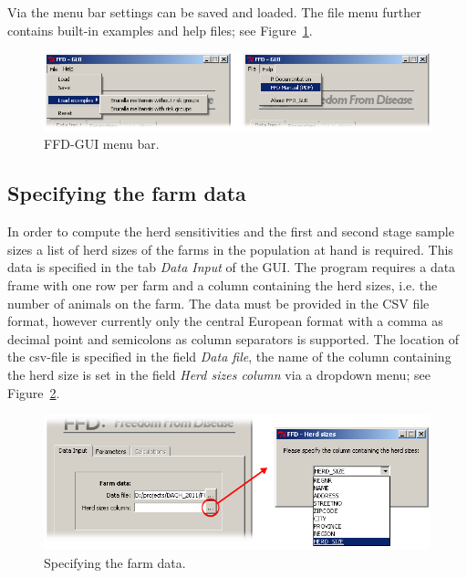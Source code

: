 \documentclass[nojss]{jss}
\begin{document}
Via the menu bar settings can be saved and loaded. The file menu further contains built-in examples and help files; see Figure~\ref{fig:GUI_menu}.

\begin{figure}[h!t]
\begin{center}
\includegraphics[width=140mm]{GUI_menu.png}
\end{center}
\caption{FFD-GUI menu bar.}
\label{fig:GUI_menu}
\end{figure}

\subsection{Specifying the farm data}
\label{subsec:GUI_farm_data}

In order to compute the herd sensitivities and the first and second stage sample sizes a list of herd sizes of the farms in the population at hand is required. This data is specified in the tab \emph{Data Input}  of the GUI. The program requires a data frame with one row per farm and a column containing the herd sizes, i.e. the number of animals on the farm. The data must be provided in the CSV file format, however currently only the central European format with a comma as decimal point and semicolons as column separators is supported. The location of the csv-file is specified in the field  \emph{Data file}, the name of the column containing the herd size is set in the field  \emph{Herd sizes column} via a dropdown menu; see Figure~\ref{fig:GUI_Herd_Size}.

\begin{figure}[h!t]
\begin{center}
\includegraphics[width=125mm]{GUI_Herd_Size2.png}
\end{center}
\caption{Specifying the farm data.}
\label{fig:GUI_Herd_Size} \end{figure}
\end{document}
